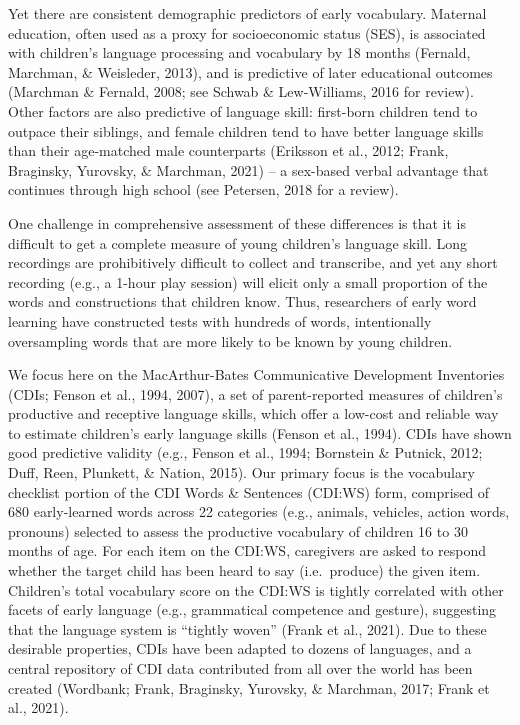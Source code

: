 \documentclass[10pt, letterpaper]{article}
\begin{document}
Yet there are consistent demographic predictors of early vocabulary.
Maternal education, often used as a proxy for socioeconomic status
(SES), is associated with children's language processing and vocabulary
by 18 months (Fernald, Marchman, \& Weisleder, 2013), and is predictive
of later educational outcomes (Marchman \& Fernald, 2008; see Schwab \&
Lew-Williams, 2016 for review). Other factors are also predictive of
language skill: first-born children tend to outpace their siblings, and
female children tend to have better language skills than their
age-matched male counterparts (Eriksson et al., 2012; Frank, Braginsky,
Yurovsky, \& Marchman, 2021) -- a sex-based verbal advantage that
continues through high school (see Petersen, 2018 for a review).

One challenge in comprehensive assessment of these differences is that
it is difficult to get a complete measure of young children's language
skill. Long recordings are prohibitively difficult to collect and
transcribe, and yet any short recording (e.g., a 1-hour play session)
will elicit only a small proportion of the words and constructions that
children know. Thus, researchers of early word learning have constructed
tests with hundreds of words, intentionally oversampling words that are
more likely to be known by young children.

We focus here on the MacArthur-Bates Communicative Development
Inventories (CDIs; Fenson et al., 1994, 2007), a set of parent-reported
measures of children's productive and receptive language skills, which
offer a low-cost and reliable way to estimate children's early language
skills (Fenson et al., 1994). CDIs have shown good predictive validity
(e.g., Fenson et al., 1994; Bornstein \& Putnick, 2012; Duff, Reen,
Plunkett, \& Nation, 2015). Our primary focus is the vocabulary
checklist portion of the CDI Words \& Sentences (CDI:WS) form, comprised
of 680 early-learned words across 22 categories (e.g., animals,
vehicles, action words, pronouns) selected to assess the productive
vocabulary of children 16 to 30 months of age. For each item on the
CDI:WS, caregivers are asked to respond whether the target child has
been heard to say (i.e.~produce) the given item. Children's total
vocabulary score on the CDI:WS is tightly correlated with other facets
of early language (e.g., grammatical competence and gesture), suggesting
that the language system is ``tightly woven'' (Frank et al., 2021). Due
to these desirable properties, CDIs have been adapted to dozens of
languages, and a central repository of CDI data contributed from all
over the world has been created (Wordbank; Frank, Braginsky, Yurovsky,
\& Marchman, 2017; Frank et al., 2021).
\end{document}
